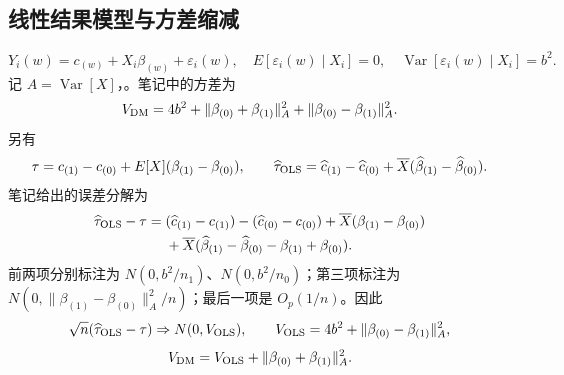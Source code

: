 \subsection{线性结果模型与方差缩减}
\[
Y_i(w)=c_{(w)}+X_i\beta_{(w)}+\varepsilon_i(w),\quad
E[\varepsilon_i(w)\mid X_i]=0,\quad
\operatorname{Var}[\varepsilon_i(w)\mid X_i]=b^2.
\]
记 $A=\operatorname{Var}[X]$，。笔记中的方差为
\[
V_{\rm DM}=4b^2+\|\beta_{(0)}+\beta_{(1)}\|_A^2
 +\|\beta_{(0)}-\beta_{(1)}\|_A^2.
\]
另有
\[
\tau=c_{(1)}-c_{(0)}+E[X](\beta_{(1)}-\beta_{(0)}),\qquad
\widehat\tau_{\rm OLS}=\widehat c_{(1)}-\widehat c_{(0)}
 +\overline X(\widehat\beta_{(1)}-\widehat\beta_{(0)}).
\]
笔记给出的误差分解为
\begin{align*}
\widehat\tau_{\rm OLS}-\tau={}&(\widehat c_{(1)}-c_{(1)})-(\widehat c_{(0)}-c_{(0)})
 +\overline X(\beta_{(1)}-\beta_{(0)})\\
&+\overline X(\widehat\beta_{(1)}-\widehat\beta_{(0)}-\beta_{(1)}+\beta_{(0)}).
\end{align*}
前两项分别标注为 $N(0,b^2/n_1)$、$N(0,b^2/n_0)$；第三项标注为 $N(0,\|\beta_{(1)}-\beta_{(0)}\|_A^2/n)$；最后一项是 $O_p(1/n)$。因此
\[
\sqrt n(\widehat\tau_{\rm OLS}-\tau)\Rightarrow N(0,V_{\rm OLS}),\qquad
V_{\rm OLS}=4b^2+\|\beta_{(0)}-\beta_{(1)}\|_A^2,
\]
\[
V_{\rm DM}=V_{\rm OLS}+\|\beta_{(0)}+\beta_{(1)}\|_A^2.
\]

